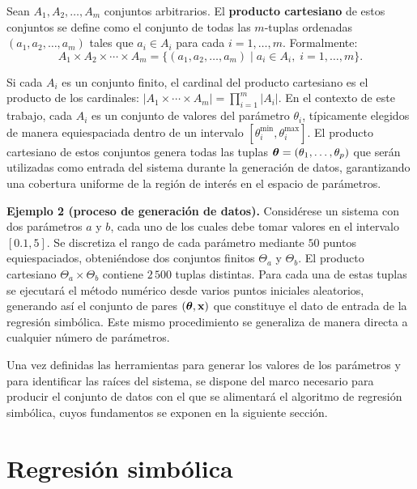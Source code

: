 \begin{definition} Sean \(A_1, A_2, \dots, A_m\) conjuntos arbitrarios. El \textbf{producto cartesiano} de estos conjuntos se define como el conjunto de todas las \(m\)-tuplas ordenadas \((a_1, a_2, \dots, a_m)\) tales que \(a_i \in A_i\) para cada \(i = 1, \dots, m\). Formalmente: \begin{equation} A_1 \times A_2 \times \cdots \times A_m = \{(a_1, a_2, \dots, a_m) \mid a_i \in A_i,\; i=1,\dots,m\}. \end{equation} \end{definition}

Si cada \(A_i\) es un conjunto finito, el cardinal del producto cartesiano es el producto de los cardinales: \(|A_1 \times \cdots \times A_m| = \prod_{i=1}^m |A_i|\). En el contexto de este trabajo, cada \(A_i\) es un conjunto de valores del parámetro \(\theta_i\), típicamente elegidos de manera equiespaciada dentro de un intervalo \([\theta_i^{\min}, \theta_i^{\max}]\). El producto cartesiano de estos conjuntos genera todas las tuplas \(\boldsymbol{\theta} = (\theta_1, \dots, \theta_p)\) que serán utilizadas como entrada del sistema durante la generación de datos, garantizando una cobertura uniforme de la región de interés en el espacio de parámetros.

\bigskip \noindent\textbf{Ejemplo 2 (proceso de generación de datos).} Considérese un sistema con dos parámetros \(a\) y \(b\), cada uno de los cuales debe tomar valores en el intervalo \([0.1, 5]\). Se discretiza el rango de cada parámetro mediante \(50\) puntos equiespaciados, obteniéndose dos conjuntos finitos \(\Theta_a\) y \(\Theta_b\). El producto cartesiano \(\Theta_a \times \Theta_b\) contiene \(2\,500\) tuplas distintas. Para cada una de estas tuplas se ejecutará el método numérico desde varios puntos iniciales aleatorios, generando así el conjunto de pares \((\boldsymbol{\theta}, \mathbf{x})\) que constituye el dato de entrada de la regresión simbólica. Este mismo procedimiento se generaliza de manera directa a cualquier número de parámetros.

Una vez definidas las herramientas para generar los valores de los parámetros y para identificar las raíces del sistema, se dispone del marco necesario para producir el conjunto de datos con el que se alimentará el algoritmo de regresión simbólica, cuyos fundamentos se exponen en la siguiente sección.

\section{Regresión simbólica} \label{sec:regresion}

